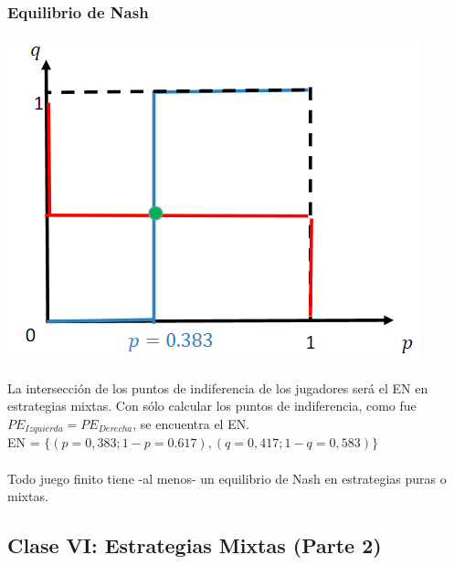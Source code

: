 \documentclass{article}
\begin{document}
            \subsubsection*{Equilibrio de Nash}
                \begin{center}
                    \includegraphics[width=0.8 \linewidth]{figs/mixtas.png}
                \end{center}
                La intersección de los puntos de indiferencia de los jugadores será el EN en estrategias mixtas. Con sólo calcular los puntos de indiferencia, como fue \(PE_{Izquierda} = PE_{Derecha}\), se encuentra el EN. \\
                EN = \(\{(p = 0,383;1-p = 0.617), (q = 0,417; 1-q = 0,583)\}\) \\
                \\
                Todo juego finito tiene -al menos- un equilibrio de Nash en estrategias puras o mixtas.
        \subsection*{Clase VI: Estrategias Mixtas (Parte 2)}
\end{document}
